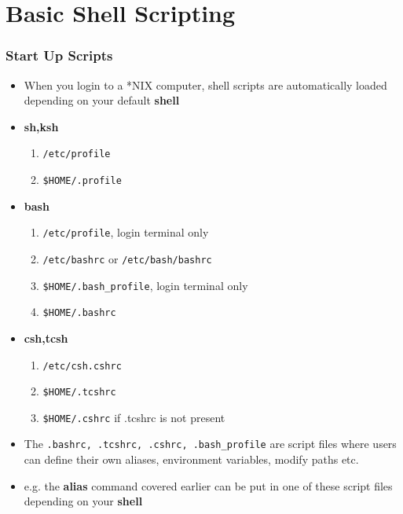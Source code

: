 \documentclass[10pt,t]{beamer}
\begin{document}
\section*{Basic Shell Scripting}
\begin{frame}
  \frametitle{Start Up Scripts}
  \begin{itemize}
    \item When you login to a *NIX computer, shell scripts are automatically loaded depending on your default \textbf{\color{lubrown}shell}
    \item \textbf{\color{lubrown}sh,ksh}
    \begin{enumerate}
        \item \texttt{\color{blue}/etc/profile}
        \item \texttt{\color{blue}\$HOME/.profile}
    \end{enumerate}
    \item \textbf{\color{lubrown}bash}
    \begin{enumerate}
        \item \texttt{\color{blue}/etc/profile}, login terminal only
        \item \texttt{\color{blue}/etc/bashrc} or \texttt{\color{blue}/etc/bash/bashrc}
        \item \texttt{\color{blue}\$HOME/.bash\_profile}, login terminal only
        \item \texttt{\color{blue}\$HOME/.bashrc}
    \end{enumerate}
    \item \textbf{\color{lubrown}csh,tcsh}
    \begin{enumerate}
        \item \texttt{\color{blue}/etc/csh.cshrc}
        \item \texttt{\color{blue}\$HOME/.tcshrc}
        \item \texttt{\color{blue}\$HOME/.cshrc} if .tcshrc is not present
    \end{enumerate}
    \item The \texttt{\color{blue}.bashrc, .tcshrc, .cshrc, .bash\_profile} are script files where users can define their own aliases, environment variables, modify paths etc.
    \item e.g. the \textbf{\color{lubrown}alias} command covered earlier can be put in one of these script files depending on your \textbf{\color{lubrown}shell}
  \end{itemize}
\end{frame}
\end{document}
